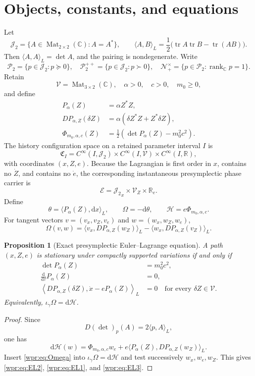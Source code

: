 \documentclass[11pt]{article}
\newtheorem{proposition}[theorem]{Proposition}
\newcommand{\J}{\mathcal J_2}
\newcommand{\V}{\mathscr V}
\newcommand{\Psd}{\mathcal P_2}
\newcommand{\Ppos}{\mathcal P_2^{++}}
\newcommand{\Nfuture}{\mathcal N_+^\times}
\newcommand{\rankC}{\operatorname{rank}_{\mathbb C}}
\newcommand{\dd}{\mathrm d}
\begin{document}
\section{Objects, constants, and equations}
Let
\[
 \J=\{A\in\operatorname{Mat}_{2\times2}(\mathbb C):A=A^*\},
\qquad
 \langle A,B\rangle_L=
 \frac12\bigl(\operatorname{tr}A\operatorname{tr}B-\operatorname{tr}(AB)\bigr).
\]
Then \(\langle A,A\rangle_L=\det A\), and the pairing is nondegenerate.
Write
\[
 \Psd=\{p\in\J:p\succeq0\},\quad
 \Ppos=\{p\in\J:p\succ0\},\quad
 \Nfuture=\{p\in\Psd:\rankC p=1\}.
\]
Retain
\[
 \V=\operatorname{Mat}_{3\times2}(\mathbb C),\quad
 \alpha>0,\quad c>0,\quad m_0\geq0,
\]
and define
\begin{align}
 P_\alpha(Z)&=\alpha Z^*Z,\label{wpr:eq:P}\\
 D P_{\alpha,Z}(\delta Z)&=
 \alpha(\delta Z^*Z+Z^*\delta Z),\label{wpr:eq:DP}\\
 \Phi_{m_0,\alpha,c}(Z)&=
 \frac12\left(\det P_\alpha(Z)-m_0^2c^2\right).\label{wpr:eq:Phi}
\end{align}
The history configuration space on a retained parameter interval \(I\) is
\[
 \mathfrak C_I=
 C^\infty(I,\J)\times C^\infty(I,\V)\times C^\infty(I,\mathbb R),
\]
with coordinates \((x,Z,e)\).  Because the Lagrangian is first order
in \(x\), contains no \(\dot Z\), and contains no \(\dot e\), the
corresponding instantaneous presymplectic phase carrier is
\[
 \mathcal E={\J}_x\times{\V}_Z\times\mathbb R_e.
\]
Define
\begin{equation}
 \theta=\langle P_\alpha(Z),\dd x\rangle_L,\qquad
 \Omega=-\dd\theta,\qquad
 \mathcal H=e\Phi_{m_0,\alpha,c}.
 \label{wpr:eq:forms}
\end{equation}
For tangent vectors \(v=(v_x,v_Z,v_e)\) and \(w=(w_x,w_Z,w_e)\),
\begin{equation}
 \Omega(v,w)=
 \langle v_x,D P_{\alpha,Z}(w_Z)\rangle_L
 -\langle w_x,D P_{\alpha,Z}(v_Z)\rangle_L.
 \label{wpr:eq:Omega}
\end{equation}

\begin{proposition}[Exact presymplectic Euler--Lagrange equation]
\label{wpr:prop:EL}
A path \((x,Z,e)\) is stationary under compactly supported variations
if and only if
\begin{align}
 \det P_\alpha(Z)&=m_0^2c^2,\label{wpr:eq:EL1}\\
 \frac{\dd}{\dd\tau}P_\alpha(Z)&=0,\label{wpr:eq:EL2}\\
 \left\langle D P_{\alpha,Z}(\delta Z),
 \dot x-eP_\alpha(Z)\right\rangle_L&=0
 \quad\text{for every }\delta Z\in\V.\label{wpr:eq:EL3}
\end{align}
Equivalently, \(\iota_{\dot\gamma}\Omega=\dd\mathcal H\).
\end{proposition}
\begin{proof}
Since
\[
 D(\det)_p(A)=2\langle p,A\rangle_L,
\]
one has
\[
 \dd\mathcal H(w)=
 \Phi_{m_0,\alpha,c}w_e+
 e\langle P_\alpha(Z),D P_{\alpha,Z}(w_Z)\rangle_L.
\]
Insert \eqref{wpr:eq:Omega} into
\(\iota_{\dot\gamma}\Omega=\dd\mathcal H\) and test successively
\(w_x,w_e,w_Z\).  This gives \eqref{wpr:eq:EL2},
\eqref{wpr:eq:EL1}, and \eqref{wpr:eq:EL3}.
\end{proof}
\end{document}
